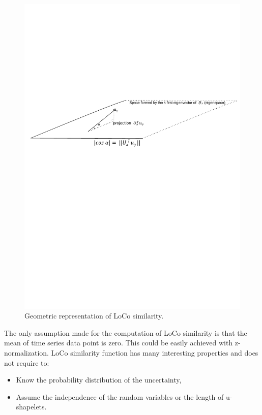 \begin{figure}[h]
\centering
 \includegraphics[scale=0.70]{images/loco2}
\caption{Geometric representation of LoCo similarity.}
\label{geoLoco}
\end{figure}



The only assumption made for the computation of LoCo similarity is that the mean of time
series data point is zero. This could be easily achieved with z-normalization.
LoCo similarity function has many interesting properties and does not require to:
\begin{itemize}
  \item  Know the probability distribution of the uncertainty,
  \item Assume the independence of the random variables or the length of
  u-shapelets.
\end{itemize}

